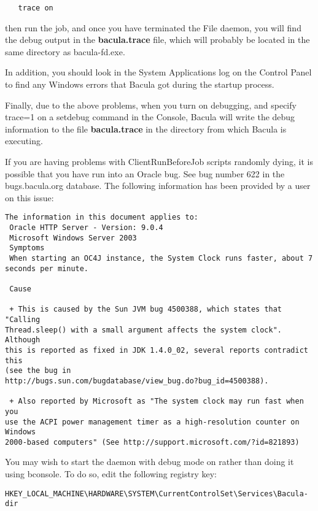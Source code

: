 \footnotesize
\begin{verbatim}
   trace on
\end{verbatim}
\normalsize

then run the job, and once you have terminated the File daemon, you will find
the debug output in the {\bf bacula.trace} file, which will probably be 
located in the same directory as bacula-fd.exe.

In addition, you should look in the System Applications log on the Control
Panel to find any Windows errors that Bacula got during the startup process. 

Finally, due to the above problems, when you turn on debugging, and specify
trace=1 on a setdebug command in the Console, Bacula will write the debug
information to the file {\bf bacula.trace} in the directory from which Bacula
is executing. 

If you are having problems with ClientRunBeforeJob scripts randomly dying, 
it is possible that you have run into an Oracle bug.  See bug number 622 in
the bugs.bacula.org database.  The following information has been
provided by a user on this issue:

\footnotesize
\begin{verbatim}
The information in this document applies to:
 Oracle HTTP Server - Version: 9.0.4
 Microsoft Windows Server 2003
 Symptoms
 When starting an OC4J instance, the System Clock runs faster, about 7
seconds per minute.
 
 Cause
 
 + This is caused by the Sun JVM bug 4500388, which states that "Calling
Thread.sleep() with a small argument affects the system clock". Although
this is reported as fixed in JDK 1.4.0_02, several reports contradict this
(see the bug in
http://bugs.sun.com/bugdatabase/view_bug.do?bug_id=4500388).
 
 + Also reported by Microsoft as "The system clock may run fast when you
use the ACPI power management timer as a high-resolution counter on Windows
2000-based computers" (See http://support.microsoft.com/?id=821893)
\end{verbatim}
\normalsize

You may wish to start the daemon with debug mode on rather than doing it
using bconsole. To do so, edit the following registry key:

\footnotesize
\begin{verbatim}
HKEY_LOCAL_MACHINE\HARDWARE\SYSTEM\CurrentControlSet\Services\Bacula-dir
\end{verbatim}
\normalsize

